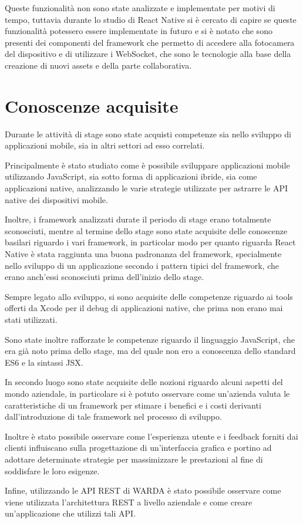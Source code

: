 Queste funzionalità non sono state analizzate e implementate per motivi di tempo, tuttavia durante lo studio di React Native si è cercato di capire se queste funzionalità potessero essere implementate in futuro e si è notato che sono presenti dei componenti del framework che permetto di accedere alla fotocamera del dispositivo e di utilizzare i WebSocket, che sono le tecnologie alla base della creazione di nuovi assets e della parte collaborativa.

\section{Conoscenze acquisite}

Durante le attività di stage sono state acquisti competenze sia nello sviluppo di applicazioni mobile, sia in altri settori ad esso correlati.

Principalmente è stato studiato come è possibile sviluppare applicazioni mobile utilizzando JavaScript, sia sotto forma di applicazioni ibride, sia come applicazioni native, analizzando le varie strategie utilizzate per astrarre le API native dei dispositivi mobile.

Inoltre, i framework analizzati durate il periodo di stage erano totalmente sconosciuti, mentre al termine dello stage sono state acquisite delle conoscenze basilari riguardo i vari framework, in particolar modo per quanto riguarda React Native è stata raggiunta una buona padronanza del framework, specialmente nello sviluppo di un applicazione secondo i pattern tipici del framework, che erano anch'essi sconosciuti prima dell'inizio dello stage.

Sempre legato allo sviluppo, si sono acquisite delle competenze riguardo ai tools offerti da Xcode per il debug di applicazioni native, che prima non erano mai stati utilizzati.

Sono state inoltre rafforzate le competenze riguardo il linguaggio JavaScript, che era già noto prima dello stage, ma del quale non ero a conoscenza dello standard ES6 e la sintassi JSX.

In secondo luogo sono state acquisite delle nozioni riguardo alcuni aspetti del mondo aziendale, in particolare si è potuto osservare come un'azienda valuta le caratteristiche di un framework per stimare i benefici e i costi derivanti dall'introduzione di tale framework nel processo di sviluppo.

Inoltre è stato possibile osservare come l'esperienza utente e i feedback forniti dai clienti influiscano sulla progettazione di un'interfaccia grafica e portino ad adottare determinate strategie per massimizzare le prestazioni al fine di soddisfare le loro esigenze.

Infine, utilizzando le API REST di WARDA è stato possibile osservare come viene utilizzata l'architettura REST a livello aziendale e come creare un'applicazione che utilizzi tali API.

